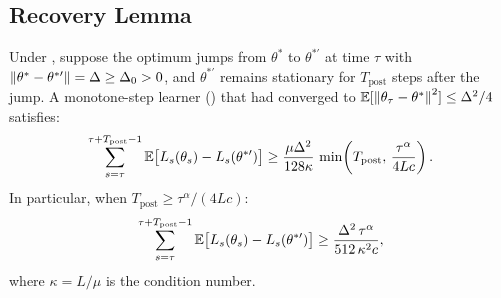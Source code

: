 \subsection{Recovery Lemma}

\begin{lemma}
\label{lem:recovery-cost}
Under , suppose
the optimum jumps from $\theta^*$ to $\theta^{*\prime}$ at time $\tau$
with $\left\|\theta^* - \theta^{*\prime}\right\| = \Delta \geq \Delta_0 > 0$,
and $\theta^{*\prime}$ remains stationary for $T_{\mathrm{post}}$ steps
after the jump.
A monotone-step learner () that had converged to
$\mathbb{E}[\left\|\theta_\tau - \theta^*\right\|^2] \leq \Delta^2/4$ satisfies:
\[
  \sum_{s=\tau}^{\tau + T_{\mathrm{post}}-1}
  \mathbb{E}\bigl[L_s(\theta_s) - L_s(\theta^{*\prime})\bigr]
  \geq \frac{\mu\Delta^2}{128\kappa}\, \min\!\left(T_{\mathrm{post}},\,
  \frac{\tau^\alpha}{4Lc}\right).
\]
In particular, when $T_{\mathrm{post}} \geq \tau^\alpha/(4Lc)$:
\[
  \sum_{s=\tau}^{\tau + T_{\mathrm{post}}-1}
  \mathbb{E}\bigl[L_s(\theta_s) - L_s(\theta^{*\prime})\bigr]
  \geq \frac{\Delta^2\,\tau^\alpha}{512\,\kappa^2 c},
\]
where $\kappa = L/\mu$ is the condition number.
\end{lemma}

